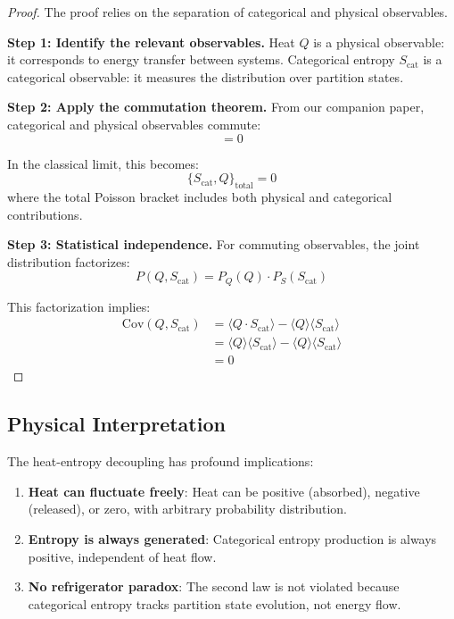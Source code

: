 \begin{proof}
The proof relies on the separation of categorical and physical observables.

\textbf{Step 1: Identify the relevant observables.}
Heat $Q$ is a physical observable: it corresponds to energy transfer between systems. Categorical entropy $S_{\text{cat}}$ is a categorical observable: it measures the distribution over partition states.

\textbf{Step 2: Apply the commutation theorem.}
From our companion paper, categorical and physical observables commute:
\begin{equation}
    [\hat{O}_{\text{cat}}, \hat{O}_{\text{phys}}] = 0
\end{equation}

In the classical limit, this becomes:
\begin{equation}
    \{S_{\text{cat}}, Q\}_{\text{total}} = 0
\end{equation}
where the total Poisson bracket includes both physical and categorical contributions.

\textbf{Step 3: Statistical independence.}
For commuting observables, the joint distribution factorizes:
\begin{equation}
    P(Q, S_{\text{cat}}) = P_Q(Q) \cdot P_S(S_{\text{cat}})
\end{equation}

This factorization implies:
\begin{align}
    \text{Cov}(Q, S_{\text{cat}}) &= \langle Q \cdot S_{\text{cat}} \rangle - \langle Q \rangle \langle S_{\text{cat}} \rangle \\
    &= \langle Q \rangle \langle S_{\text{cat}} \rangle - \langle Q \rangle \langle S_{\text{cat}} \rangle \\
    &= 0
\end{align}
\end{proof}

\subsection{Physical Interpretation}

The heat-entropy decoupling has profound implications:

\begin{enumerate}
    \item \textbf{Heat can fluctuate freely}: Heat can be positive (absorbed), negative (released), or zero, with arbitrary probability distribution.

    \item \textbf{Entropy is always generated}: Categorical entropy production is always positive, independent of heat flow.

    \item \textbf{No refrigerator paradox}: The second law is not violated because categorical entropy tracks partition state evolution, not energy flow.
\end{enumerate}


